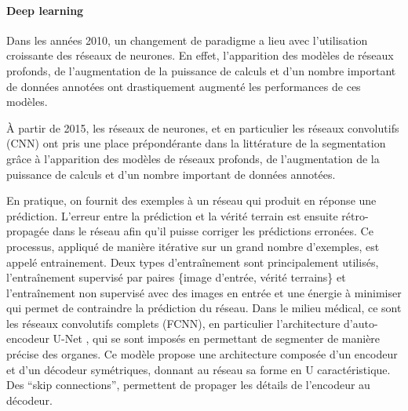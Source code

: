       \paragraph{Deep learning}

      Dans les années 2010, un changement de paradigme a lieu avec l'utilisation croissante des réseaux de neurones. En effet, l'apparition des modèles de réseaux profonds, de l'augmentation de la puissance de calculs et d'un nombre important de données annotées ont drastiquement augmenté les performances de ces modèles.

      À partir de 2015, les réseaux de neurones, et en particulier les réseaux convolutifs (CNN) ont pris une place prépondérante dans la littérature de la segmentation grâce à l'apparition des modèles de réseaux profonds, de l'augmentation de la puissance de calculs et d'un nombre important de données annotées.

      En pratique, on fournit des exemples à un réseau qui produit en réponse une prédiction. L'erreur entre la prédiction et la vérité terrain est ensuite rétro-propagée dans le réseau afin qu'il puisse corriger les prédictions erronées. Ce processus, appliqué de manière itérative sur un grand nombre d'exemples, est appelé entrainement. Deux types d'entraînement sont principalement utilisés, l'entraînement supervisé par paires \{image d'entrée, vérité terrains\} et l'entraînement non supervisé avec des images en entrée et une énergie à minimiser qui permet de contraindre la prédiction du réseau.
      Dans le milieu médical, ce sont les réseaux convolutifs complets (FCNN), en particulier l'architecture d'auto-encodeur U-Net \cite{Ronneberger2015_Unet}, qui se sont imposés en permettant de segmenter de manière précise des organes. Ce modèle propose une architecture composée d'un encodeur et d'un décodeur symétriques, donnant au réseau sa forme en U caractéristique. Des ``skip connections'', permettent de propager les détails de l'encodeur au décodeur.

